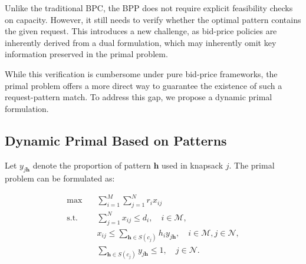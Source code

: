 




Unlike the traditional BPC, the BPP does not require explicit feasibility checks on capacity. However, it still needs to verify whether the optimal pattern contains the given request. This introduces a new challenge, as bid-price policies are inherently derived from a dual formulation, which may inherently omit key information preserved in the primal problem.

While this verification is cumbersome under pure bid-price frameworks, the primal problem offers a more direct way to guarantee the existence of such a request-pattern match. To address this gap, we propose a dynamic primal formulation.

\subsection{Dynamic Primal Based on Patterns}

Let $y_{j \bm{h}}$ denote the proportion of pattern $\bm{h}$ used in knapsack $j$. The primal problem can be formulated as:

\begin{equation}\label{improve_primal}
    \begin{aligned}
    \max \quad & \sum_{i=1}^M \sum_{j=1}^N r_i x_{i j} \\
    \text {s.t.} \quad & \sum_{j=1}^N x_{i j} \leq d_i, \quad i \in \mathcal{M}, \\
    & x_{i j} \leq \sum_{\bm{h} \in S(c_{j})} h_i y_{j \bm{h}}, \quad i \in \mathcal{M}, j \in \mathcal{N}, \\
    & \sum_{\bm{h} \in S(c_{j})} y_{j \bm{h}} \leq 1, \quad j \in \mathcal{N}.
    \end{aligned}
\end{equation}


